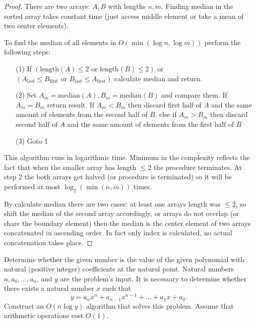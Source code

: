 \begin{proof}
There are two arrays: $A, B$ with lengths $n, m$. Finding median in the sorted array takes constant time (just access middle element or take a mean of two center elements).

To find the median of all elements in $O(\min(\log n, \log m))$ perform the following steps:
\begin{itemize}
\item[(1)] If $(\text{length}(A) \leq 2 \text{ or } \text{length}(B) \leq 2)$ or $(A_{\text{last}} \leq B_{\text{first}} \text{ or } B_{\text{last}} \leq A_{\text{first}})$ calculate median and return.
\item[(2)] Set $A_m = \text{median}(A), B_m = \text{median}(B)$ and compare them. If $A_m = B_m$ return result. If $A_m < B_m$ then discard first half of $A$ and the same amount of elements from the second half of $B$. else if $A_m > B_m$ then discard second half of $A$ and the same amount of elements from the first half of $B$
\item[(3)] Goto 1
\end{itemize}

This algorithm runs in logarithmic time. Minimum in the complexity reflects the fact that when the smaller array has length $\leq 2$ the procedure terminates. At step $2$ the both arrays get halved (or procedure is terminated) so it will be performed at most $\log_2(\min(n,m))$ times.

By calculate median there are two cases: at least one arrays length was $\leq 2$, so shift the median of the second array accordingly, or arrays do not overlap (or share the boundary element) then the median is the center element of two arrays concatenated in ascending order. In fact only index is calculated, no actual concatenation takes place.
\end{proof}
\vskip 0.6in



\begin{prob}
Determine whether the given number is the value of the given polynomial with natural (positive integer) coefficients at the natural point. Natural numbers $n, a_0, \ldots, a_n$, and $y$ are the problem's input. It is necessary to determine whether there exists a natural number $x$ such that
$$
y = a_n x^n + a_{n-1} x^{n-1} + \ldots + a_1 x + a_0.
$$
Construct an $O(n \log y)$ algorithm that solves this problem. Assume that arithmetic operations cost $O(1)$.
\end{prob}

